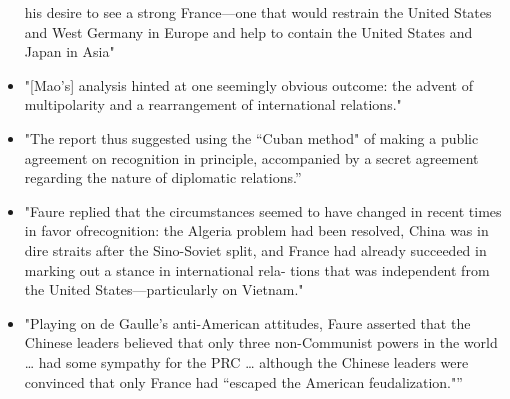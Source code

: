 \documentclass[letterpaper]{article}
\begin{document}
\begin{itemize}
his desire to see a strong France---one that would restrain the United
States and West Germany in Europe and help to contain the United
States and Japan in Asia"
\item "[Mao's] analysis hinted at one seemingly obvious outcome: the advent
of multipolarity and a rearrangement of international relations."
\item "The report thus suggested using the “Cuban method" of making a public
agreement on recognition in principle, accompanied by a secret
agreement regarding the nature of diplomatic relations.”
\item "Faure replied that the circumstances seemed to have changed in recent
times in favor ofrecognition: the Algeria problem had been resolved,
China was in dire straits after the Sino-Soviet split, and France had
already succeeded in marking out a stance in international rela- tions
that was independent from the United States---particularly on
Vietnam."
\item "Playing on de Gaulle's anti-American attitudes, Faure asserted that
the Chinese leaders believed that only three non-Communist powers in
the world \ldots{} had some sympathy for the PRC \ldots{} although the Chinese
leaders were convinced that only France had “escaped the American
feudalization."”
\end{itemize}
\end{document}
